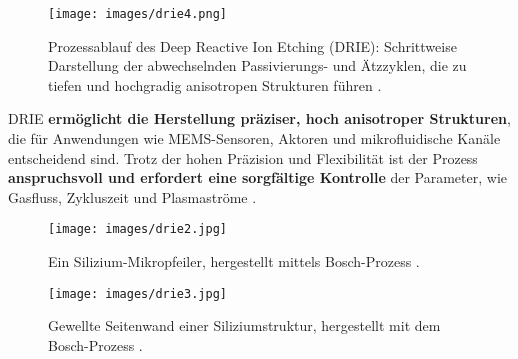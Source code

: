\documentclass{article} %
\begin{document}
\begin{figure}[htb!]
    \centering
    \texttt{[image: images/drie4.png]} %
    \captionsetup{labelfont=bf, width=.6\textwidth} %
    \caption{Prozessablauf des Deep Reactive Ion Etching (DRIE): Schrittweise Darstellung der abwechselnden Passivierungs- und Ätzzyklen, die zu tiefen und hochgradig anisotropen Strukturen führen \cite{wikipedia_DRIE}.}
    \label{fig:drie4}
\end{figure}
\vspace{1em}

DRIE \textbf{ermöglicht die Herstellung präziser, hoch anisotroper Strukturen}, die für Anwendungen wie MEMS-Sensoren, Aktoren und mikrofluidische Kanäle entscheidend sind. Trotz der hohen Präzision und Flexibilität ist der Prozess \textbf{anspruchsvoll und erfordert eine sorgfältige Kontrolle} der Parameter, wie Gasfluss, Zykluszeit und Plasmaströme \cite{madou2002, wolf2000}.

\begin{figure}[htb!]
    \centering
    \texttt{[image: images/drie2.jpg]} %
    \captionsetup{labelfont=bf, width=\textwidth} %
    \caption{Ein Silizium-Mikropfeiler, hergestellt mittels Bosch-Prozess \cite{wikipedia_en_DRIE}.}
    \label{fig:drie2}
\end{figure}

\begin{figure}[htb!]
    \centering
    \texttt{[image: images/drie3.jpg]} %
    \captionsetup{labelfont=bf, width=\textwidth} %
    \caption{Gewellte Seitenwand einer Siliziumstruktur, hergestellt mit dem Bosch-Prozess \cite{wikipedia_en_DRIE}.}
    \label{fig:drie3}
\end{figure}





\clearpage
\thispagestyle{empty}
\thispagestyle{empty}
\end{document}
